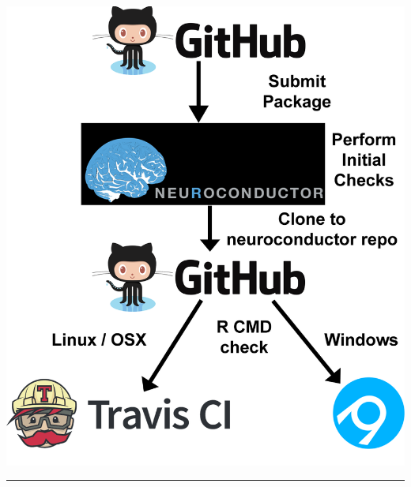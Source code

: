 \documentclass[final]{beamer}\usepackage[]{graphicx}\usepackage[]{color}
\begin{document}
\begin{frame}[fragile]
\begin{table}[!htb]
\begin{minipage}{0.36\linewidth}
\begin{center}
\includegraphics[width=0.6\linewidth]{neuroc_workflow.png}
\end{center}

\noindent\rule{\linewidth}{5pt}




\end{minipage}
\end{table}
\end{frame}
\end{document}
